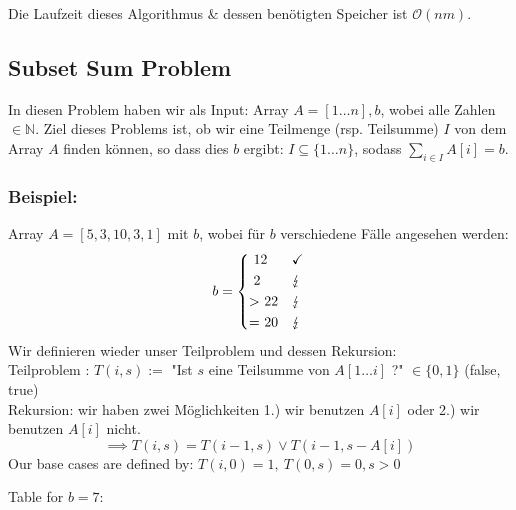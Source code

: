 \documentclass[a4paper]{article}
\begin{document}
Die Laufzeit dieses Algorithmus \& dessen benötigten Speicher ist $\mathcal{O}(nm)$.


\subsection{Subset Sum Problem}
In diesen Problem haben wir als Input: Array $A = [1\dots n], b$, wobei alle Zahlen $\in \mathbb{N}$. Ziel dieses Problems ist, ob wir eine Teilmenge (rsp. Teilsumme) $I$ von dem Array $A$ finden können, so dass dies $b$ ergibt:
$I \subseteq \lbrace 1\dots n\rbrace$, sodass $\sum_{i\in I}A[i] = b$.
\subsubsection*{Beispiel:}
Array $A = [5, 3, 10, 3, 1]$ mit $b$, wobei für $b$ verschiedene Fälle angesehen werden:
\begin{equation*}
 b = 
    \begin{cases*}
           $ 12 $ &  \checkmark\\
           $ 2 $  &  $\lightning$ \\
           $> 22$ &  $\lightning$ \\
           $= 20$ &  $\lightning$
        \end{cases*}
\end{equation*}
Wir definieren wieder unser Teilproblem und dessen Rekursion: \\
Teilproblem : $T(i, s) :=$ "Ist $s$ eine Teilsumme von $A[1\dots i]$ ?" $\in \lbrace 0, 1 \rbrace$ (false, true) \\
Rekursion: wir haben zwei Möglichkeiten 1.) wir benutzen $A[i]$ oder 2.) wir benutzen $A[i]$ nicht. 
\begin{equation*}
    \implies T(i, s) = T(i-1, s) \lor T(i-1, s-A[i]) 
\end{equation*}
Our base cases are defined by: $ T(i, 0) = 1,\ T(0, s) = 0, s > 0$

Table for $b= 7$: 
\end{document}
